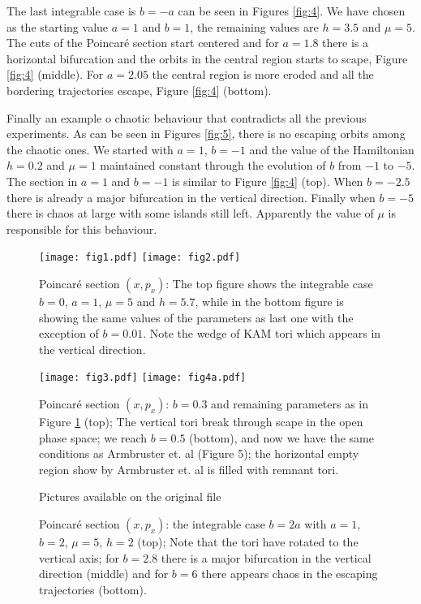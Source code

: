 \documentclass[final]{siamart0516}
\begin{document}
The last integrable case is $b=-a$ can be seen in Figures \ref{fig:4}. We have chosen as the starting value $a=1$ and $b=1$, the remaining values are $h=3.5$ and $\mu=5$. The cuts of the Poincar\'e section start centered and for $a=1.8$ there is  a horizontal
bifurcation and the orbits in the central region starts to scape, Figure \ref{fig:4} (middle). For $a=2.05$ the central region is more eroded and all the bordering trajectories escape, Figure \ref{fig:4} (bottom).

Finally an example o chaotic behaviour that contradicts all the previous experiments.  As can be seen in Figures \ref{fig:5}, there is no escaping orbits among the chaotic ones. We started with $a=1$, $b=-1$ and the value of the Hamiltonian $h=0.2$ and 
$\mu=1$ maintained constant through the evolution of $b$ from $-1$ to $-5$. The section in $a=1$ and $b=-1$ is similar to
Figure \ref{fig:4} (top). When $b=-2.5$ there is  already  a major bifurcation in the vertical direction.  Finally when $b=-5$ there is chaos
at large with some islands still left. Apparently the value of $\mu$ is responsible for this behaviour.

\begin{figure}[tbhp]
\centering
\texttt{[image: fig1.pdf]}
\texttt{[image: fig2.pdf]}
\caption{Poincar\'e section $(x,p_x)$:  The top figure shows the integrable case  $b=0$, $a=1$, $\mu=5$ and $h=5.7$, while 
in the bottom figure is showing  the same values of the parameters as last one with the exception of  $b= 0.01$. Note the wedge of KAM tori which appears in the vertical direction.}
\label{fig:1}
\end{figure}


\begin{figure}[ht]
\begin{center} 
\texttt{[image: fig3.pdf]}
\texttt{[image: fig4a.pdf]}
\end{center}
\caption{Poincar\'e section $(x,p_x)$:  $b=0.3$ and remaining parameters as in Figure \ref{fig:1} (top); The vertical tori break through scape in the open phase space; we reach  $b=0.5$ (bottom), and now we have the same conditions as Armbruster et. al \cite{agk} (Figure 5); the horizontal empty region show by Armbruster et. al \cite{agk} is filled with remnant tori.}
\label{fig:2}      
\end{figure}

\begin{figure}
\begin{center}
	Pictures available on the original file
\end{center}
\caption{Poincar\'e section $(x,p_x)$:  the integrable  case $b=2a$ with   $a=1$, $b=2$, $\mu=5$,  $h=2$ (top); Note that the tori have rotated to the vertical axis;  for $b=2.8$ there is a major bifurcation in the vertical direction (middle) and  for  $b=6$ there appears chaos in the escaping trajectories (bottom).}
\label{fig:3}      
\end{figure}
\end{document}
